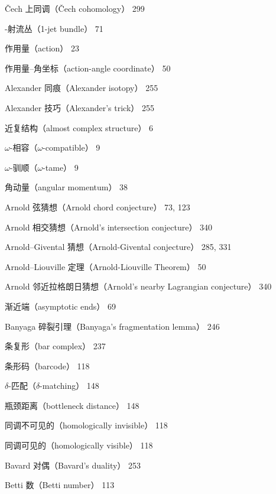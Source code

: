 {\noindent Čech 上同调（Čech cohomology） 299\par
{}-射流丛（1-jet bundle） 71\par
\noindent 作用量（action） 23\par
\noindent 作用量–角坐标（action-angle coordinate） 50\par
\noindent Alexander 同痕（Alexander isotopy） 255\par
\noindent Alexander 技巧（Alexander's trick） 255\par
\noindent 近复结构（almost complex structure） 6\par
\noindent\hspace*{1.5em}$\omega$-相容（$\omega$-compatible） 9\par
\noindent\hspace*{1.5em}$\omega$-驯顺（$\omega$-tame） 9\par
\noindent 角动量（angular momentum） 38\par
\noindent Arnold 弦猜想（Arnold chord conjecture） 73, 123\par
\noindent Arnold 相交猜想（Arnold's intersection conjecture） 340\par
\noindent Arnold–Givental 猜想（Arnold-Givental conjecture） 285, 331\par
\noindent Arnold–Liouville 定理（Arnold-Liouville Theorem） 50\par
\noindent Arnold 邻近拉格朗日猜想（Arnold's nearby Lagrangian conjecture） 340\par
\noindent 渐近端（asymptotic ends） 69\par
\noindent Banyaga 碎裂引理（Banyaga's fragmentation lemma） 246\par
\noindent 条复形（bar complex） 237\par
\noindent 条形码（barcode） 118\par
\noindent\hspace*{1.5em}$\delta$-匹配（$\delta$-matching） 148\par
\noindent\hspace*{1.5em}瓶颈距离（bottleneck distance） 148\par
\noindent\hspace*{1.5em}同调不可见的（homologically invisible） 118\par
\noindent\hspace*{1.5em}同调可见的（homologically visible） 118\par
\noindent Bavard 对偶（Bavard's duality） 253\par
\noindent Betti 数（Betti number） 113\par
}
